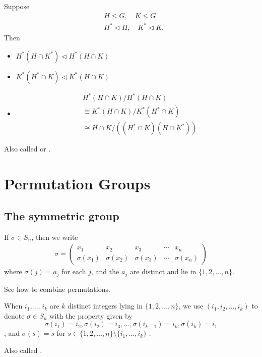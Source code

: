 \begin{theorem}
	Suppose 
	\begin{align*}
		&H\le G,\quad K \le G\\
		&H^* \triangleleft H, \quad K^* \triangleleft K
	.\end{align*}
	Then
	\begin{itemize}
		\item $H^*(H \cap K^*) \triangleleft H^* (H \cap K)$
	\item $K^*(H^* \cap K) \triangleleft K^*(H \cap K)$
	\item 
		\begin{align*}
			&H^*(H \cap K) / H^*(H \cap K)\\
			&\cong K^*(H \cap K) / K^*(H ^* \cap K) \\
			&\cong H \cap K / \left( (H^* \cap K) (H \cap K^*) \right) 
		\end{align*}

	\end{itemize}
	Also called  or .
\end{theorem}

\section{Permutation Groups}
\subsection{The symmetric group}

\begin{notation}
	If $\sigma \in S_n$, then we write 
	\begin{align}
\sigma=\left(\begin{array}{ccccc}
x_1 & x_2 & x_3 & \cdots & x_n \\
\sigma\left(x_1\right) & \sigma\left(x_2\right) & \sigma\left(x_3\right) & \cdots & \sigma\left(x_n\right)
\end{array}\right)
\end{align}
where $\sigma(j) = a_j$ for each $j$, and the $a_j$ are distinct and lie in $\{1,2,\ldots,n\} $.
\end{notation}

See how to combine permutations.

\begin{notation}
	When $i_1,\ldots,i_k$ are $k$ distinct integers lying in $\{1,2,\ldots,n\} $, we use $(i_1,i_2,\ldots,i_k)$ to denote $\sigma \in S_n$ with the property given by \[
		\sigma(i_1) = i_2, \sigma(i_2) = i_3, \ldots,\sigma(i_{k-1}) = i_k, \sigma(i_k) = i_1
	\] 
	, and $\sigma(s) = s$ for $s \in \{1,2,\ldots,n\}\setminus \{i_1,\ldots,i_k\} $ .

	Also called .
\end{notation}

